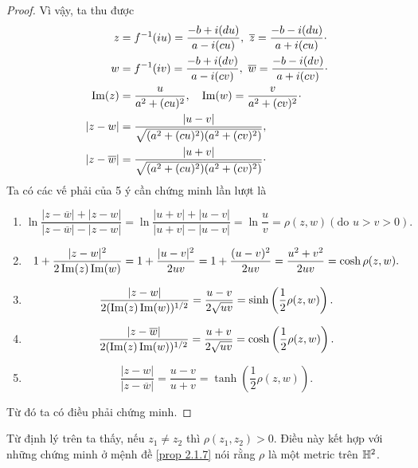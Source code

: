 \begin{proof}
    Vì vậy, ta thu được 
    \begin{align*}
        z &= f^{-1}(iu) =\dfrac{-b+i(du)}{a-i(cu)},~\overline{z} =\dfrac{-b-i(du)}{a+i(cu)}\cdot\\
        w &= f^{-1}(iv) =\dfrac{-b+i(dv)}{a-i(cv)},~\overline{w} =\dfrac{-b-i(dv)}{a+i(cv)}\cdot\\
        \operatorname{Im}(z) &= \dfrac{u}{a^2+(cu)^2},\quad
        \operatorname{Im}(w) = \dfrac{v}{a^2+(cv)^2}\cdot\\
        |z-w|  &= \dfrac{|u-v|}{\sqrt{(a^2+(cu)^2)(a^2+(cv)^2)}},\\
        |z-\overline{w}|  & =\dfrac{|u+v|}{\sqrt{(a^2+(cu)^2)(a^2+(cv)^2)}}\cdot
    \end{align*}
    Ta có các vế phải của 5 ý cần chứng minh lần lượt là 
    \begin{enumerate}
        \item \[\ln{\dfrac{|z-\overline{w}|+|z-w|}{|z-\overline{w}|-|z-w|}}
            = \ln{\dfrac{|u+v|+|u-v|}{|u+v|-|u-v|}}
            = \ln{\dfrac{u}{v}} = \rho(z,w)(\text{do }u>v>0).\]
        \item \[1 + \dfrac{|z-w|^2}{2\operatorname{Im}(z)\operatorname{Im}(w)} = 1 + \dfrac{|u-v|^2}{2uv} = 1 + \dfrac{(u-v)^2}{2uv} = \dfrac{u^2+v^2}{2uv} = \cosh{\rho(z,w)}.\]
        \item \[\dfrac{|z-w|}{2(\operatorname{Im}(z)\operatorname{Im}(w))^{1/2}}= \dfrac{u-v}{2\sqrt{uv}} = \sinh\left(\dfrac{1}{2}\rho(z,w)\right).\]
        \item \[\dfrac{|z-\overline{w}|}{2(\operatorname{Im}(z)\operatorname{Im}(w))^{1/2}}= \dfrac{u+v}{2\sqrt{uv}} = \cosh\left(\dfrac{1}{2}\rho(z,w)\right).\]
        \item \[\dfrac{|z-w|}{|z-\overline{w}|}=\dfrac{u-v}{u+v} = \tanh\left(\dfrac{1}{2}\rho(z,w)\right).\]
    \end{enumerate}
    Từ đó ta có điều phải chứng minh.
\end{proof}
\begin{remark*}
    Từ định lý trên ta thấy, nếu $z_1\neq z_2$ thì $\rho(z_1,z_2) >0$. Điều này kết hợp với những chứng minh ở mệnh đề \ref{prop 2.1.7} nói rằng $\rho$ là một metric trên $\mathbb{H}^2$.
\end{remark*}

    
